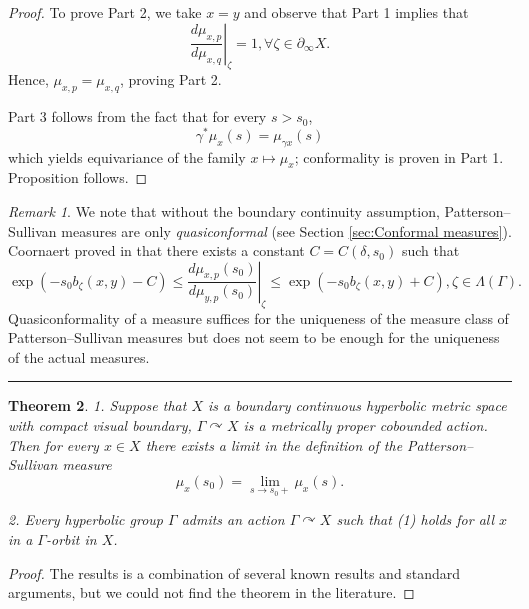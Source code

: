 \documentclass[12pt]{amsbook}%
\newtheorem{thm}{Theorem}[chapter]
\theoremstyle{definition}
\theoremstyle{remark}
\newtheorem{rem}[thm]{Remark}
\numberwithin{section}{chapter}
\numberwithin{subsection}{section}
\numberwithin{figure}{chapter}
\DeclareMathOperator{\acts}{\curvearrowright}
\def\Ga{\Gamma}
\def\ga{\gamma}
\def\La{\Lambda}
\def\geo{\partial_\infty}
\def\kap{}
\begin{document}
{{\begin{proof}
To prove Part 2, we take $x=y$ and observe that Part 1 implies that
$$
\left. \frac{d\mu_{x,p}}{d\mu_{x,q}} \right\vert_\zeta = 1, \forall \zeta\in \geo X.
$$
Hence, $\mu_{x,p}=\mu_{x,q}$, proving Part 2. 

Part 3 follows from the fact that for every $s> s_0$, 
$$
\ga^* \mu_{x}(s)= \mu_{\ga x}(s)
$$
which yields equivariance of the family $x\mapsto \mu_x$; conformality is proven in Part 1. 
Proposition follows. \end{proof}

 
\begin{rem}\label{rem:quasiconformal} 
{\kap We note that without the boundary continuity assumption, Patter\-son--Sullivan  
measures are only {\em quasiconformal} (see Section \ref{sec:Conformal measures}). Coornaert proved in 
 \cite[Th\'eor\`eme 5.4]{Coo93} that there exists a constant $C=C(\delta, s_0)$ such that 
$$
 \exp(-s_0  b_\zeta(x,y)  - C) \leqslant \left.  \frac{d\mu_{x,p}(s_0)}{d\mu_{y,p}(s_0)}\right\vert_\zeta \leqslant  \exp(-s_0  b_\zeta(x,y)  + C), \zeta\in \La(\Ga).
$$ 
Quasiconformality of a measure suffices for the uniqueness of the measure class of 
Patterson--Sullivan measures but does not seem to be enough for the uniqueness of the actual measures. }
\end{rem}

\hrule



\begin{thm}\label{thm:uniqueness} 
1. Suppose that $X$ is a  boundary continuous  hyperbolic metric space with compact visual boundary, $\Ga\acts X$ is a metrically proper cobounded 
action. Then for every 
$x\in X$ %
there exists a limit in the definition of the Patterson--Sullivan measure 
$$
\mu_{x}(s_0)=\lim_{s\to s_0+} \mu_{x}(s).$$

2. Every hyperbolic group $\Ga$ admits an action $\Ga\acts X$ such that (1) holds for all $x$ in a $\Ga$-orbit in $X$. 
\end{thm}
\begin{proof} The results is a combination of several known results and standard arguments, but we could not find the theorem in the literature. 


\end{proof}}}
\end{document}
